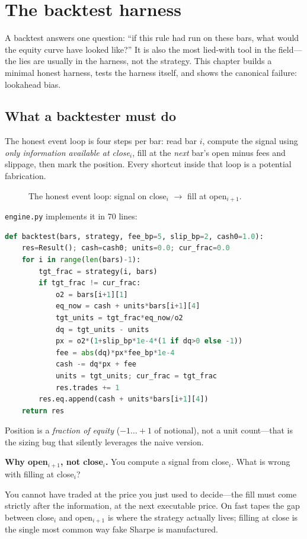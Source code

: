 \chapter{The backtest harness}\label{ch:backtest}

\noindent A backtest answers one question: ``if this rule had run on these bars, what would
the equity curve have looked like?'' It is also the most lied-with tool in the field---the
lies are usually in the harness, not the strategy. This chapter builds a minimal honest
harness, tests the harness itself, and shows the canonical failure: lookahead bias.

\section{What a backtester must do}\label{sec:harness}

The honest event loop is four steps per bar: read bar $i$, compute the signal using
\emph{only information available at close$_i$}, fill at the \emph{next} bar's open minus
fees and slippage, then mark the position. Every shortcut inside that loop is a potential
fabrication.

\begin{figure}[htbp]\centering

\caption{The honest event loop: signal on close$_i$ $\to$ fill at open$_{i+1}$.}
\label{fig:btflow}
\end{figure}

\texttt{engine.py} implements it in 70 lines:
\begin{lstlisting}[language=Python, numbers=none]
def backtest(bars, strategy, fee_bp=5, slip_bp=2, cash0=1.0):
    res=Result(); cash=cash0; units=0.0; cur_frac=0.0
    for i in range(len(bars)-1):
        tgt_frac = strategy(i, bars)
        if tgt_frac != cur_frac:
            o2 = bars[i+1][1]
            eq_now = cash + units*bars[i+1][4]
            tgt_units = tgt_frac*eq_now/o2
            dq = tgt_units - units
            px = o2*(1+slip_bp*1e-4*(1 if dq>0 else -1))
            fee = abs(dq)*px*fee_bp*1e-4
            cash -= dq*px + fee
            units = tgt_units; cur_frac = tgt_frac
            res.trades += 1
        res.eq.append(cash + units*bars[i+1][4])
    return res
\end{lstlisting}
Position is a \emph{fraction of equity} ($-1\ldots+1$ of notional), not a unit count---that
is the sizing bug that silently leverages the naive version.

\begin{example}\label{ex:fillrule}
\textbf{Why open$_{i+1}$, not close$_i$.} You compute a signal from close$_i$. What is wrong
with filling at close$_i$?
\begin{solution}
You cannot have traded at the price you just used to decide---the fill must come strictly
after the information, at the next executable price. On fast tapes the gap between close$_i$
and open$_{i+1}$ is where the strategy actually lives; filling at close is the single most
common way fake Sharpe is manufactured.
\end{solution}
\end{example}

